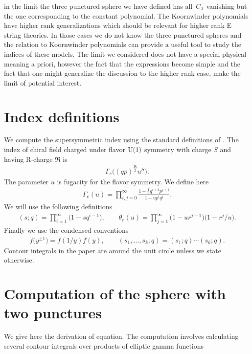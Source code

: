 \documentclass[a4paper,12pt]{article}
\begin{document}
in the limit the three punctured sphere we have defined has all~$C_\lambda$ vanishing but the one corresponding to the constant polynomial. The Koornwinder polynomials have higher rank generalizations which should be relevant for higher rank E string theories. In those cases we do not know the three punctured spheres and the relation to Koornwinder polynomials can provide a useful tool to study the indices of these models. The limit we considered does not have a special physical meaning a priori, however the fact that the expressions become simple and the fact that one might generalize the discussion to the higher rank case, make the limit of potential interest.
\appendix
\section{Index definitions}
We compute the supersymmetric index  using the standard definitions of . The index of chiral field charged under flavor ${\rm U}(1)$ symmetry with charge $S$ and having R-charge ${\mathfrak R}$ is
\begin{gather*}
 \Gamma_e\big((q p)^{\frac{ \mathfrak R}2} u^S\big) .
\end{gather*}
The parameter $u$ is fugacity for the flavor symmetry. We define here
\begin{gather*} \Gamma_e(u) = \prod_{i,j=0}^\infty \frac{1-\frac1u q^{i+1}p^{j+1}}{1- u p^i q^j} .
\end{gather*} We will use the following definitions
\begin{gather*}
 (s;q)= \prod_{i=1}^\infty \big(1-s q^{i-1}\big) ,\qquad \theta_r(u)=\prod_{j=1}^\infty \big(1- u r^{j-1}\big)\big(1-r^j/u\big) .
\end{gather*} Finally we use the condensed conventions
\begin{gather*}
f\big(y^{\pm1}\big) =f(1/y) f(y) ,	\qquad (s_1,\dots,s_k;q) =(s_1;q)\cdots(s_k;q) .
\end{gather*}
Contour integrals in the paper are around the unit circle unless we state otherwise.
\section{Computation of the sphere with two punctures}
We give here the derivation of equation. The computation involves calculating several contour integrals over products of elliptic gamma functions
\end{document}
